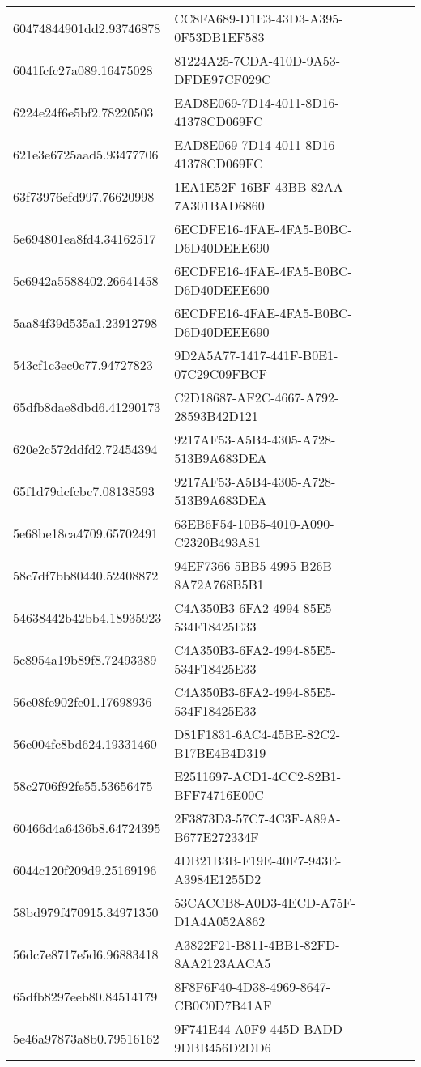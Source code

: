 \begin{tabular}{ll}
60474844901dd2.93746878 & CC8FA689-D1E3-43D3-A395-0F53DB1EF583 \\
6041fcfc27a089.16475028 & 81224A25-7CDA-410D-9A53-DFDE97CF029C \\
6224e24f6e5bf2.78220503 & EAD8E069-7D14-4011-8D16-41378CD069FC \\
621e3e6725aad5.93477706 & EAD8E069-7D14-4011-8D16-41378CD069FC \\
63f73976efd997.76620998 & 1EA1E52F-16BF-43BB-82AA-7A301BAD6860 \\
5e694801ea8fd4.34162517 & 6ECDFE16-4FAE-4FA5-B0BC-D6D40DEEE690 \\
5e6942a5588402.26641458 & 6ECDFE16-4FAE-4FA5-B0BC-D6D40DEEE690 \\
5aa84f39d535a1.23912798 & 6ECDFE16-4FAE-4FA5-B0BC-D6D40DEEE690 \\
543cf1c3ec0c77.94727823 & 9D2A5A77-1417-441F-B0E1-07C29C09FBCF \\
65dfb8dae8dbd6.41290173 & C2D18687-AF2C-4667-A792-28593B42D121 \\
620e2c572ddfd2.72454394 & 9217AF53-A5B4-4305-A728-513B9A683DEA \\
65f1d79dcfcbc7.08138593 & 9217AF53-A5B4-4305-A728-513B9A683DEA \\
5e68be18ca4709.65702491 & 63EB6F54-10B5-4010-A090-C2320B493A81 \\
58c7df7bb80440.52408872 & 94EF7366-5BB5-4995-B26B-8A72A768B5B1 \\
54638442b42bb4.18935923 & C4A350B3-6FA2-4994-85E5-534F18425E33 \\
5c8954a19b89f8.72493389 & C4A350B3-6FA2-4994-85E5-534F18425E33 \\
56e08fe902fe01.17698936 & C4A350B3-6FA2-4994-85E5-534F18425E33 \\
56e004fc8bd624.19331460 & D81F1831-6AC4-45BE-82C2-B17BE4B4D319 \\
58c2706f92fe55.53656475 & E2511697-ACD1-4CC2-82B1-BFF74716E00C \\
60466d4a6436b8.64724395 & 2F3873D3-57C7-4C3F-A89A-B677E272334F \\
6044c120f209d9.25169196 & 4DB21B3B-F19E-40F7-943E-A3984E1255D2 \\
58bd979f470915.34971350 & 53CACCB8-A0D3-4ECD-A75F-D1A4A052A862 \\
56dc7e8717e5d6.96883418 & A3822F21-B811-4BB1-82FD-8AA2123AACA5 \\
65dfb8297eeb80.84514179 & 8F8F6F40-4D38-4969-8647-CB0C0D7B41AF \\
5e46a97873a8b0.79516162 & 9F741E44-A0F9-445D-BADD-9DBB456D2DD6 \\

\end{tabular}
